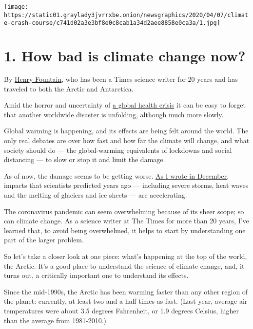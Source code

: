 \texttt{[image: https://static01.graylady3jvrrxbe.onion/newsgraphics/2020/04/07/climate-crash-course/c741d02a3e3bf8e0c8cab1a34d2aee8858e0ca3a/1.jpg]}

\hypertarget{1-how-bad-is-climate-change-now}{%
\section{\texorpdfstring{\textbf{1.} How bad is climate change
now?}{1. How bad is climate change now?}}\label{1-how-bad-is-climate-change-now}}

By \href{https://www.nytimes3xbfgragh.onion/by/henry-fountain}{Henry
Fountain}, who has been a Times science writer for 20 years and has
traveled to both the Arctic and Antarctica.

Amid the horror and uncertainty of
\href{https://www.nytimes3xbfgragh.onion/interactive/2020/world/coronavirus-maps.html}{a
global health crisis} it can be easy to forget that another worldwide
disaster is unfolding, although much more slowly.

Global warming is happening, and its effects are being felt around the
world. The only real debates are over how fast and how far the climate
will change, and what society should do --- the global-warming
equivalents of lockdowns and social distancing --- to slow or stop it
and limit the damage.

As of now, the damage seems to be getting worse.
\href{https://www.nytimes3xbfgragh.onion/2019/12/04/climate/climate-change-acceleration.html}{As
I wrote in December,} impacts that scientists predicted years ago ---
including severe storms, heat waves and the melting of glaciers and ice
sheets --- are accelerating.

The coronavirus pandemic can seem overwhelming because of its sheer
scope; so can climate change. As a science writer at The Times for more
than 20 years, I've learned that, to avoid being overwhelmed, it helps
to start by understanding one part of the larger problem.

So let's take a closer look at one piece: what's happening at the top of
the world, the Arctic. It's a good place to understand the science of
climate change, and, it turns out, a critically important one to
understand its effects.

Since the mid-1990s, the Arctic has been warming faster than any other
region of the planet: currently, at least two and a half times as fast.
(Last year, average air temperatures were about 3.5 degrees Fahrenheit,
or 1.9 degrees Celsius, higher than the average from 1981-2010.)

